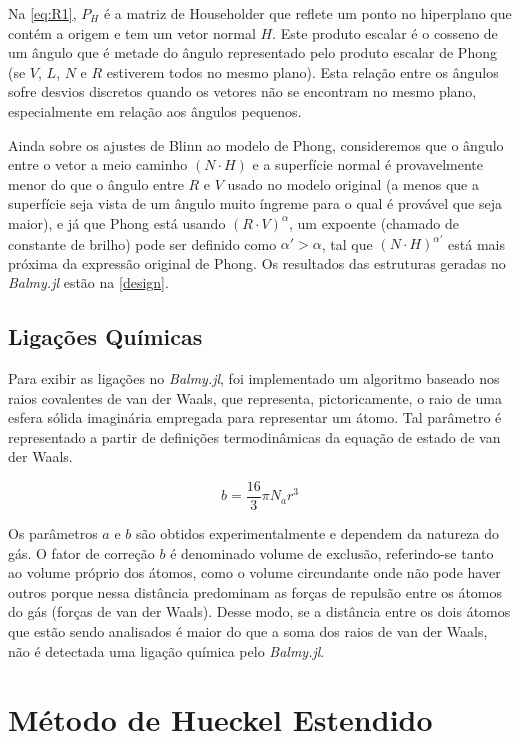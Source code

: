 Na \autoref{eq:R1}, $P_H$ é a matriz de Householder que reflete um ponto no hiperplano que contém a origem e tem um vetor normal $H$. Este produto escalar é o cosseno de um ângulo que é metade do ângulo representado pelo produto escalar de Phong (se $V$, $L$, $N$ e $R$ estiverem todos no mesmo plano). Esta relação entre os ângulos sofre desvios discretos quando os vetores não se encontram no mesmo plano, especialmente em relação aos ângulos pequenos.

Ainda sobre os ajustes de Blinn ao modelo de Phong, consideremos que o ângulo entre o vetor a meio caminho $(N \cdot H)$ e a superfície normal é provavelmente menor do que o ângulo entre $R$ e $V$ usado no modelo original (a menos que a superfície seja vista de um ângulo muito íngreme para o qual é provável que seja maior), e já que Phong está usando $(R \cdot V)^\alpha$, um expoente (chamado de constante de brilho) pode ser definido como $\alpha' > \alpha$, tal que $(N \cdot H)^{\alpha'}$ está mais próxima da expressão original de Phong. Os resultados das estruturas geradas no \textit{Balmy.jl} estão na \autoref{design}.

\subsection{Ligações Químicas}

Para exibir as ligações no \textit{Balmy.jl}, foi implementado um algoritmo baseado nos raios covalentes de van der Waals, que representa, pictoricamente, o raio de uma esfera sólida imaginária empregada para representar um átomo. Tal parâmetro é representado a partir de definições termodinâmicas da equação de estado de van der Waals.

\begin{equation}
    b = \frac{16}{3} \pi N_a r^3
\end{equation}

Os parâmetros $a$ e $b$ são obtidos experimentalmente e dependem da natureza do gás. O fator de correção $b$ é denominado volume de exclusão, referindo-se tanto ao volume próprio dos átomos, como o volume circundante onde não pode haver outros porque nessa distância predominam as forças de repulsão entre os átomos do gás (forças de van der Waals). Desse modo, se a distância entre os dois átomos que estão sendo analisados é maior do que a soma dos raios de van der Waals, não é detectada uma ligação química pelo \textit{Balmy.jl}.

\section{Método de Hueckel Estendido}


